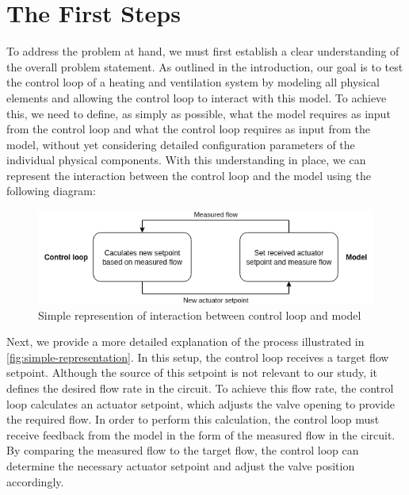 \documentclass[we,final,11pt,oneside,openany]{uantwerpenbamathesis}
\begin{document}


\chapter{The First Steps}
\label{ch:the-first-steps}

To address the problem at hand, we must first establish a clear understanding of the overall problem statement.
As outlined in the introduction, our goal is to test the control loop of a heating and ventilation system by modeling all physical elements and allowing the control loop to interact with this model.
To achieve this, we need to define, as simply as possible, what the model requires as input from the control loop and what the control loop requires as input from the model, without yet considering detailed configuration parameters of the individual physical components.
With this understanding in place, we can represent the interaction between the control loop and the model using the following diagram:

\begin{figure}[h!]
    \centering
    \includegraphics[width=0.6\linewidth]{Images/generated/simple-representation}
    \caption{Simple represention of interaction between control loop and model}
    \label{fig:simple-representation}
\end{figure}

Next, we provide a more detailed explanation of the process illustrated in \autoref{fig:simple-representation}.
In this setup, the control loop receives a target flow setpoint.
Although the source of this setpoint is not relevant to our study, it defines the desired flow rate in the circuit.
To achieve this flow rate, the control loop calculates an actuator setpoint, which adjusts the valve opening to provide the required flow.
In order to perform this calculation, the control loop must receive feedback from the model in the form of the measured flow in the circuit.
By comparing the measured flow to the target flow, the control loop can determine the necessary actuator setpoint and adjust the valve position accordingly.
\end{document}
